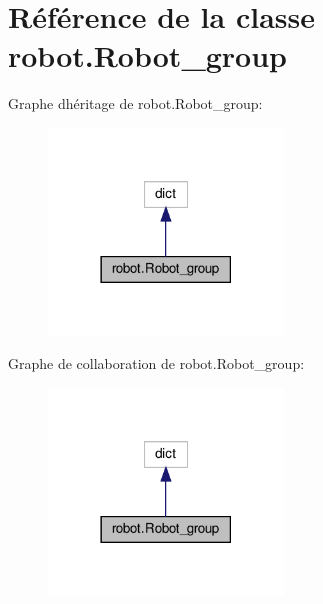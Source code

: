 \hypertarget{classrobot_1_1Robot__group}{}\section{Référence de la classe robot.\+Robot\+\_\+group}
\label{classrobot_1_1Robot__group}


Graphe d\textquotesingle{}héritage de robot.\+Robot\+\_\+group\+:
\nopagebreak
\begin{figure}[H]
\begin{center}
\leavevmode
\includegraphics[width=177pt]{classrobot_1_1Robot__group__inherit__graph}
\end{center}
\end{figure}


Graphe de collaboration de robot.\+Robot\+\_\+group\+:
\nopagebreak
\begin{figure}[H]
\begin{center}
\leavevmode
\includegraphics[width=177pt]{classrobot_1_1Robot__group__coll__graph}
\end{center}
\end{figure}
